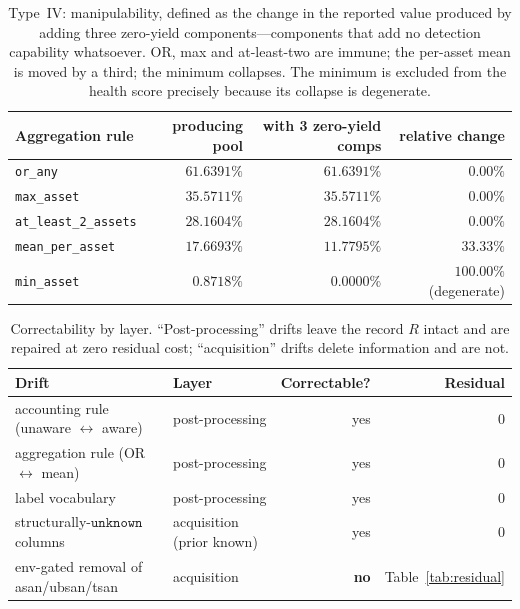 \documentclass{article}
\newcommand{\unk}{\texttt{unknown}}
\begin{document}
\begin{table}[h]
\centering
\small
\caption{Type~IV: manipulability, defined as the change in the reported value produced by adding three
zero-yield components---components that add no detection capability whatsoever. OR, max and at-least-two
are immune; the per-asset mean is moved by a third; the minimum collapses. The minimum is excluded from the
health score precisely because its collapse is degenerate.}
\label{tab:manip}
\begin{tabular}{@{}p{3.6cm} r r r@{}}
\toprule
Aggregation rule & producing pool & with 3 zero-yield comps & relative change \\
\midrule
\texttt{or\_any} & $61.6391\%$ & $61.6391\%$ & $0.00\%$ \\
\texttt{max\_asset} & $35.5711\%$ & $35.5711\%$ & $0.00\%$ \\
\texttt{at\_least\_2\_assets} & $28.1604\%$ & $28.1604\%$ & $0.00\%$ \\
\texttt{mean\_per\_asset} & $17.6693\%$ & $11.7795\%$ & $\mathbf{33.33\%}$ \\
\texttt{min\_asset} & $0.8718\%$ & $0.0000\%$ & $100.00\%$ (degenerate) \\
\bottomrule
\end{tabular}
\end{table}

\begin{table}[h]
\centering
\small
\caption{Correctability by layer. ``Post-processing'' drifts leave the record $R$ intact and are repaired at
zero residual cost; ``acquisition'' drifts delete information and are not.}
\label{tab:correct}
\begin{tabular}{@{}p{6.5cm} l r r@{}}
\toprule
Drift & Layer & Correctable? & Residual \\
\midrule
accounting rule (unaware $\leftrightarrow$ aware) & post-processing & yes & $0$ \\
aggregation rule (OR $\leftrightarrow$ mean) & post-processing & yes & $0$ \\
label vocabulary & post-processing & yes & $0$ \\
structurally-$\unk$ columns & acquisition (prior known) & yes & $0$ \\
env-gated removal of asan/ubsan/tsan & acquisition & \textbf{no} & Table~\ref{tab:residual} \\
\bottomrule
\end{tabular}
\end{table}
\end{document}
